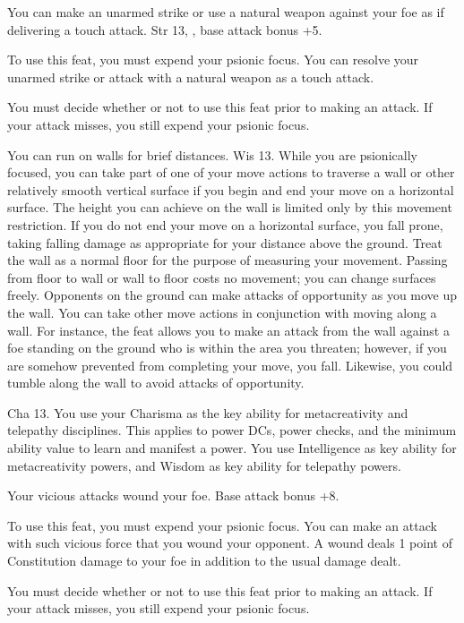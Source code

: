 {You can make an unarmed strike or use a natural weapon against your foe as if delivering a touch attack.}
{Str 13, , base attack bonus +5.}
{To use this feat, you must expend your psionic focus. You can resolve your unarmed strike or attack with a natural weapon as a touch attack.

You must decide whether or not to use this feat prior to making an attack. If your attack misses, you still expend your psionic focus.}
{}{}

{You can run on walls for brief distances.}
{Wis 13.}
{While you are psionically focused, you can take part of one of your move actions to traverse a wall or other relatively smooth vertical surface if you begin and end your move on a horizontal surface. The height you can achieve on the wall is limited only by this movement restriction. If you do not end your move on a horizontal surface, you fall prone, taking falling damage as appropriate for your distance above the ground. Treat the wall as a normal floor for the purpose of measuring your movement. Passing from floor to wall or wall to floor costs no movement; you can change surfaces freely. Opponents on the ground can make attacks of opportunity as you move up the wall.}
{}
{You can take other move actions in conjunction with moving along a wall. For instance, the  feat allows you to make an attack from the wall against a foe standing on the ground who is within the area you threaten; however, if you are somehow prevented from completing your move, you fall. Likewise, you could tumble along the wall to avoid attacks of opportunity.}

{}
{Cha 13.}
{You use your Charisma as the key ability for metacreativity and telepathy disciplines. This applies to power DCs, power checks, and the minimum ability value to learn and manifest a power.}
{You use Intelligence as key ability for metacreativity powers, and Wisdom as key ability for telepathy powers.}
{}


{Your vicious attacks wound your foe.}
{Base attack bonus +8.}
{To use this feat, you must expend your psionic focus. You can make an attack with such vicious force that you wound your opponent. A wound deals 1 point of Constitution damage to your foe in addition to the usual damage dealt.

You must decide whether or not to use this feat prior to making an attack. If your attack misses, you still expend your psionic focus.}
{}{}

